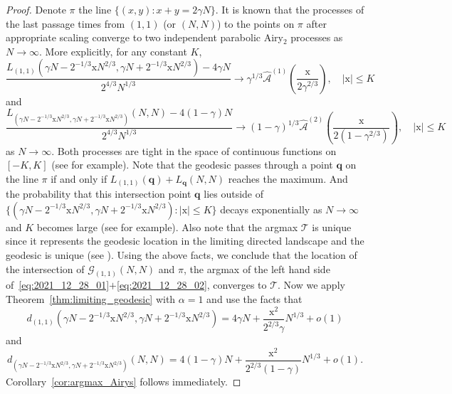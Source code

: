 \documentclass{article}
\numberwithin{equation}{section}
\newcommand{\gd}{{\mathcal{G}}}
\begin{document}
\begin{proof}
	Denote $\pi$ the line $\{(x,y):x+y=2\gamma N\}$.
	It is known \cite{Johansson03} that the processes of the last passage times from $(1,1)$ (or $(N,N)$) to the points on $\pi$ after appropriate scaling converge to two independent parabolic Airy$_2$ processes as $N\to\infty$. More explicitly, for any constant $K$,
	\begin{equation}
		\label{eq:2021_12_28_01}
		\frac{L_{(1,1)}(\gamma N - 2^{-1/3}\mathrm{x} N^{2/3},\gamma N + 2^{-1/3}\mathrm{x} N^{2/3})-4\gamma N}{2^{4/3}N^{1/3}} \to \gamma^{1/3}\mathcal{\hat A}^{(1)}\left(\frac{\mathrm{x}}{2\gamma^{2/3}}\right),\quad |\mathrm{x}|\le K
	\end{equation}
and
\begin{equation}
	\label{eq:2021_12_28_02}
	\frac{L_{(\gamma N - 2^{-1/3}\mathrm{x} N^{2/3},\gamma N + 2^{-1/3}\mathrm{x} N^{2/3})}(N,N)-4(1-\gamma) N}{2^{4/3}N^{1/3}} \to (1-\gamma)^{1/3}\mathcal{\hat A}^{(2)}\left(\frac{\mathrm{x}}{2(1-\gamma^{2/3})}\right),\quad |\mathrm{x}|\le K
\end{equation}
as $N\to\infty$. Both processes are tight in the space of continuous functions on $[-K,K]$ (see  \cite[Theorem 2.3]{Ferrari-Occelli18} for example). Note that the geodesic passes through a point $\mathbf{q}$ on the line $\pi$ if and only if $L_{(1,1)}(\mathbf{q})+L_{\mathbf{q}}(N,N)$ reaches the maximum. And the probability that this intersection point $\mathbf{q}$ lies outside of $\{(\gamma N - 2^{-1/3}\mathrm{x} N^{2/3},\gamma N + 2^{-1/3}\mathrm{x} N^{2/3}): |\mathrm{x}|\le K\}$ decays exponentially as $N\to\infty$ and $K$ becomes large (see \cite[Proposition 2.1]{Baik-Liu16b} for example). Also note that the argmax $\mathcal{T}$ is unique since it represents the geodesic location in the limiting directed landscape and the geodesic is unique (see \cite{Dauvergne-Virag21}). Using the above facts, we conclude that the location of the intersection of $\gd_{(1,1)}(N,N)$ and $\pi$, the argmax of the left hand side of~\eqref{eq:2021_12_28_01}$+$\eqref{eq:2021_12_28_02}, converges to $\mathcal{T}$. Now we apply Theorem~\ref{thm:limiting_geodesic} with $\alpha=1$ and use the facts that 
\begin{equation*}
	d_{(1,1)}(\gamma N - 2^{-1/3}\mathrm{x} N^{2/3},\gamma N + 2^{-1/3}\mathrm{x} N^{2/3})=4\gamma N+\frac{\mathrm{x}^2}{2^{2/3}\gamma}N^{1/3}+o(1)
\end{equation*}
and
\begin{equation*}
	d_{(\gamma N - 2^{-1/3}\mathrm{x} N^{2/3},\gamma N + 2^{-1/3}\mathrm{x} N^{2/3})}(N,N)=4(1-\gamma) N+\frac{\mathrm{x}^2}{2^{2/3}(1-\gamma)}N^{1/3}+o(1).
\end{equation*}
Corollary~\ref{cor:argmax_Airys} follows immediately.
\end{proof}
\end{document}
